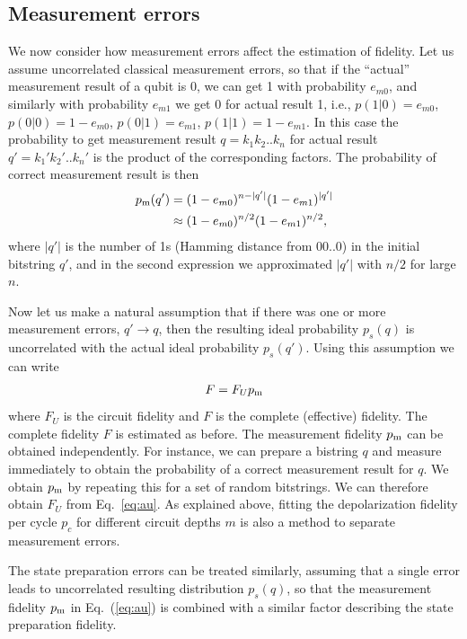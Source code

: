 \subsection{Measurement errors}\label{sec:me}
We now consider how measurement errors affect the estimation of
fidelity.
Let us assume uncorrelated classical measurement errors, so that
if the ``actual'' measurement result of a qubit is 0, we can get 1 with
probability $e_{m0}$, and similarly with probability $e_{m1}$
we get 0 for actual result 1, i.e., $p(1|0)=e_{m0}$,
$p(0|0)=1-e_{m0}$, $p(0|1)=e_{m1}$, $p(1|1)=1-e_{m1}$. In
this case the probability to get measurement result $q=k_1 k_2 .. k_n$
for actual result $q'=k_1' k_2' .. k_n'$ is the product of the
corresponding factors. The probability of correct measurement result is then
 \begin{align}
 p_{\rm m} (q') &= (1-e_{m0})^{n-|q'|} (1-e_{m1})^{|q'|}  \nonumber \\&\approx (1-e_{m0})^{n/2} (1-e_{m1})^{n/2},
    \label{meas-good}
\end{align}
where $|q'|$ is the number of 1s (Hamming distance from 00..0) in
the initial bitstring $q'$, and in the second expression we approximated $|q'|$ with $n/2$ for large $n$. 


Now let us make a natural assumption that if there was one or more
measurement errors, $q'\to q$, then the resulting ideal probability
$p_s(q)$ is uncorrelated with the
actual ideal probability $p_s(q')$. Using this assumption we
can write
\begin{align}\label{eq:au}
  F = F_U   p_{\rm m}
\end{align}
where  $F_U$ is the circuit fidelity and $F$ is the complete (effective) fidelity. The complete fidelity $F$ is estimated as
before. The measurement fidelity $p_{\rm m}$ can be
obtained independently. For instance, we can prepare a bistring $q$
and measure immediately to obtain the probability of a correct  measurement result for $q$. We obtain $p_{\rm m}$ by repeating this for
a set of random bitstrings. We can therefore obtain $F_U$ from
Eq.~\eqref{eq:au}. As explained above, fitting the depolarization
fidelity per cycle $p_c$ for different circuit depths $m$ is also a
method to separate measurement errors.

The state preparation errors can be treated similarly, assuming that a single error leads to uncorrelated resulting distribution $p_s(q)$, so that the measurement fidelity $p_{\rm m}$ in Eq.\ (\ref{eq:au}) is combined with a similar factor describing the state preparation fidelity.

